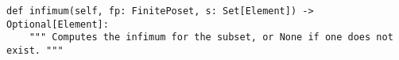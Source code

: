 \begin{verbatim}
def infimum(self, fp: FinitePoset, s: Set[Element]) -> Optional[Element]:
    """ Computes the infimum for the subset, or None if one does not exist. """
\end{verbatim}